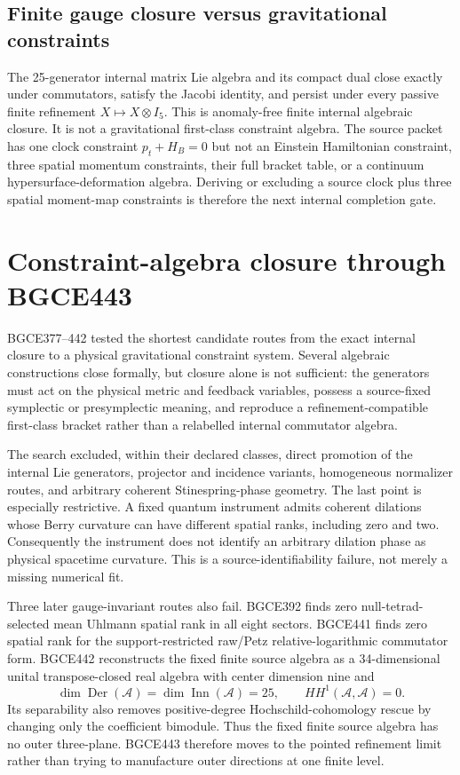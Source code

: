 \documentclass[11pt]{article}
\theoremstyle{definition}
\theoremstyle{remark}
\begin{document}
\subsection{Finite gauge closure versus gravitational constraints}

The 25-generator internal matrix Lie algebra and its compact dual close exactly under commutators, satisfy the Jacobi identity, and persist under every passive finite refinement $X\mapsto X\otimes I_5$. This is anomaly-free finite internal algebraic closure. It is not a gravitational first-class constraint algebra. The source packet has one clock constraint $p_t+H_B=0$ but not an Einstein Hamiltonian constraint, three spatial momentum constraints, their full bracket table, or a continuum hypersurface-deformation algebra. Deriving or excluding a source clock plus three spatial moment-map constraints is therefore the next internal completion gate.

\section{Constraint-algebra closure through BGCE443}\label{sec:constraints09}

BGCE377--442 tested the shortest candidate routes from the exact internal closure to a physical gravitational constraint system. Several algebraic constructions close formally, but closure alone is not sufficient: the generators must act on the physical metric and feedback variables, possess a source-fixed symplectic or presymplectic meaning, and reproduce a refinement-compatible first-class bracket rather than a relabelled internal commutator algebra.

The search excluded, within their declared classes, direct promotion of the internal Lie generators, projector and incidence variants, homogeneous normalizer routes, and arbitrary coherent Stinespring-phase geometry. The last point is especially restrictive. A fixed quantum instrument admits coherent dilations whose Berry curvature can have different spatial ranks, including zero and two. Consequently the instrument does not identify an arbitrary dilation phase as physical spacetime curvature. This is a source-identifiability failure, not merely a missing numerical fit.

Three later gauge-invariant routes also fail. BGCE392 finds zero null-tetrad-selected mean Uhlmann spatial rank in all eight sectors. BGCE441 finds zero spatial rank for the support-restricted raw/Petz relative-logarithmic commutator form. BGCE442 reconstructs the fixed finite source algebra as a 34-dimensional unital transpose-closed real algebra with center dimension nine and
\begin{equation}
 \dim\operatorname{Der}(\mathcal A)
 =\dim\operatorname{Inn}(\mathcal A)=25,
 \qquad
 HH^1(\mathcal A,\mathcal A)=0.
\end{equation}
Its separability also removes positive-degree Hochschild-cohomology rescue by changing only the coefficient bimodule. Thus the fixed finite source algebra has no outer three-plane. BGCE443 therefore moves to the pointed refinement limit rather than trying to manufacture outer directions at one finite level.
\end{document}
